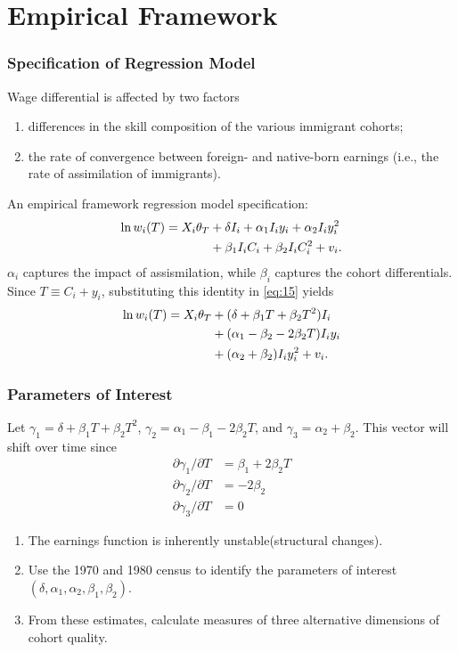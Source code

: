 \documentclass[10pt]{beamer}
\begin{document}
\section{Empirical Framework}
\begin{frame}[c]\frametitle{Specification of Regression Model}
Wage differential is affected by two factors
\begin{enumerate}
    \item differences in the skill composition of the various immigrant cohorts;
    \item the rate of convergence between foreign- and native-born earnings (i.e., the rate of assimilation of immigrants).
\end{enumerate}

An empirical framework regression model specification:
\begin{align}
    \ln w_{i}(T) = X_{i} \theta_{T} &+ \delta I_{i} + \alpha_{1} I_{i} y_{i} + \alpha_{2} I_{i} y_{i}^{2}\notag \\
    &+ \beta_{1} I_{i}C_{i} + \beta_{2}I_{i}C_{i}^{2} + v_{i}. \label{eq:15}
\end{align}
$\alpha_{i}$ captures the impact of assismilation, while $\beta_{i}$ captures the cohort differentials. Since $T\equiv C_{i} + y_{i}$, substituting this identity in \eqref{eq:15} yields
\begin{align}
    \ln w_{i}(T) = X_{i}\theta_{T} &+ (\delta+\beta_{1}T+\beta_{2}T^{2}) I_{i} \notag \\
    &+ (\alpha_{1}-\beta_{2}-2 \beta_{2}T)I_{i}y_{i}\notag\\
    &+ (\alpha_{2}+\beta_{2})I_{i}y_{i}^{2} + v_{i}.
\end{align}

\end{frame}

\begin{frame}[c]\frametitle{Parameters of Interest}
Let $\gamma_{1} = \delta + \beta_{1} T + \beta_{2} T^{2}$, $\gamma_{2} = \alpha_{1} - \beta_{1} -2 \beta_{2}T$, and $\gamma_{3} = \alpha_{2} + \beta_{2}$. This vector will shift over time since
\begin{align}
    \partial \gamma_{1} / \partial T &= \beta_{1} + 2 \beta_{2} T\\
    \partial \gamma_{2} / \partial T &= -2 \beta_{2}\\
    \partial \gamma_{3} / \partial T &= 0
\end{align}

\begin{enumerate}
    \item The earnings function is inherently unstable(structural changes).
    \item Use the 1970 and 1980 census to identify the parameters of interest $(\delta,\alpha_{1},\alpha_{2},\beta_{1},\beta_{2})$.
    \item From these estimates, calculate measures of three alternative dimensions of cohort quality.
\end{enumerate}

\end{frame}
\end{document}
